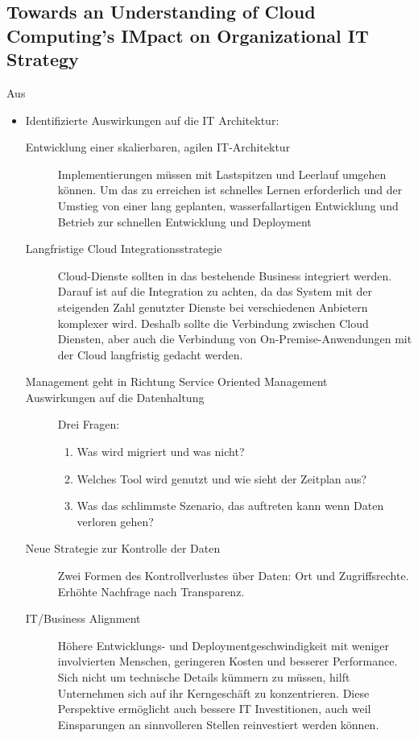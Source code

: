 \subsection{Towards an Understanding of Cloud Computing's IMpact on Organizational IT Strategy}
Aus 
\begin{itemize}
	\item Identifizierte Auswirkungen auf die IT Architektur:
	\begin{description}
		\item[Entwicklung einer skalierbaren, agilen IT-Architektur] Implementierungen müssen mit Lastspitzen und Leerlauf umgehen können. Um das zu erreichen ist schnelles Lernen erforderlich und der Umstieg von einer lang geplanten, wasserfallartigen Entwicklung und Betrieb zur schnellen Entwicklung und Deployment
		\item[Langfristige Cloud Integrationsstrategie] Cloud-Dienste sollten in das bestehende Business integriert werden. Darauf ist auf die Integration zu achten, da das System mit der steigenden Zahl genutzter Dienste bei verschiedenen Anbietern komplexer wird. Deshalb sollte die Verbindung zwischen Cloud Diensten, aber auch die Verbindung von On-Premise-Anwendungen mit der Cloud langfristig gedacht werden.
		\item[Management geht in Richtung Service Oriented Management]
		\item[Auswirkungen  auf die Datenhaltung] Drei Fragen:
		\begin{enumerate}
			\item Was wird migriert und was nicht?
			\item Welches Tool wird genutzt und wie sieht der Zeitplan aus?
			\item Was das schlimmste Szenario, das auftreten kann wenn Daten verloren gehen?
		\end{enumerate}
		\item[Neue Strategie zur Kontrolle der Daten] Zwei Formen des Kontrollverlustes über Daten: Ort und Zugriffsrechte. Erhöhte Nachfrage nach Transparenz.
		\item[IT/Business Alignment] Höhere Entwicklungs- und Deploymentgeschwindigkeit mit weniger involvierten Menschen, geringeren Kosten und besserer Performance. \\
		Sich nicht um technische Details kümmern zu müssen, hilft Unternehmen sich auf ihr Kerngeschäft zu konzentrieren. Diese Perspektive ermöglicht auch bessere IT Investitionen, auch weil Einsparungen an sinnvolleren Stellen reinvestiert werden können.
	\end{description}
\end{itemize}





